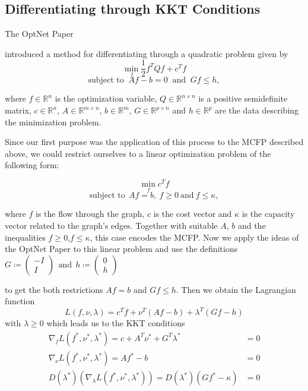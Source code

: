 \documentclass{article}
\begin{document}
\subsection{Differentiating through KKT Conditions}
\label{others}

The OptNet Paper {\cite{AmosK17}  introduced a method for differentiating through a quadratic problem given by
\[ \min_f \frac{1}{2} f^T Q f + c^T f \]
\[\text{subject to }~  Af-b=0 ~\text{ and }~ Gf \leq h, \]

where $f\in \mathbb{R}^n$ is the optimization variable, $Q\in \mathbb{R}^{n\times n}$ is a positive semidefinite matrix, $c\in \mathbb{R}^n$, $A\in \mathbb{R}^{m\times n}$, $b\in \mathbb{R}^m$, $G\in \mathbb{R}^{p\times n}$ and $h\in \mathbb{R}^p$ are the data describing the minimization problem. 

Since our first purpose was the application of this process to the MCFP described above, we could restrict ourselves to a linear optimization problem of the following form:

\[\min_f c^T f\] 
\[ \text{subject to} ~~Af=b,~f\geq 0 ~\text{and}~ f \leq \kappa,\]

where $f$ is the flow through the graph, $c$ is the cost vector and $\kappa$ is the capacity vector related to the graph's edges. Together with suitable $A$, $b$ and the inequalities $f\geq 0$,\break $f\leq \kappa$, this case encodes the MCFP. Now we apply the ideas of the OptNet Paper to this linear problem and use the definitions
$G\coloneqq \begin{pmatrix} -I \\  I \end{pmatrix} ~~\text{and} ~~ h\coloneqq \begin{pmatrix} 0 \\ h \end{pmatrix} $

to get the both restrictions $Af=b$ and $Gf\leq h$. Then we obtain the Lagrangian function
\[L(f, \nu, \lambda) = c^T f + \nu ^T (Af-b) + \lambda^T(Gf-h)\]
with $\lambda \geq 0$ which leads us to the KKT conditions
\begin{align*}
\nabla_f L(f^*,\nu^*, \lambda^*) = c + A^T \nu^*  + G^T\lambda^* &= 0 \\
\nabla _\nu L(f^*, \nu^*, \lambda^*) = Af^* - b &= 0 \\
D(\lambda^*) (\nabla_\lambda L(f^*, \nu^*, \lambda^*)) = D(\lambda^*)(Gf^*-\kappa) &= 0
\end{align*}

}
\end{document}
